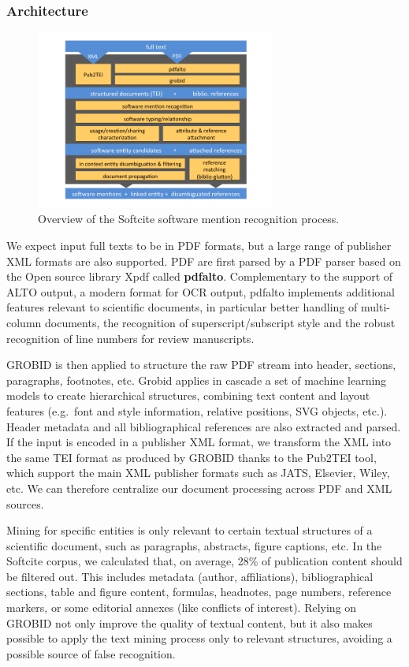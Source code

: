 \documentclass[
]{article}
\begin{document}
\hypertarget{architecture}{%
\subsubsection{Architecture}\label{architecture}}

\begin{figure}
\centering
\includegraphics[width=0.7\textwidth,height=\textheight]{workflow_software_mention.png}
\caption{Overview of the Softcite software mention recognition process.}
\end{figure}

We expect input full texts to be in PDF formats, but a large range of
publisher XML formats are also supported. PDF are first parsed by a PDF
parser based on the Open source library Xpdf called \textbf{pdfalto}.
Complementary to the support of ALTO output, a modern format for OCR
output, pdfalto implements additional features relevant to scientific
documents, in particular better handling of multi-column documents, the
recognition of superscript/subscript style and the robust recognition of
line numbers for review manuscripts.

GROBID is then applied to structure the raw PDF stream into header,
sections, paragraphs, footnotes, etc. Grobid applies in cascade a set of
machine learning models to create hierarchical structures, combining
text content and layout features (e.g.~font and style information,
relative positions, SVG objects, etc.). Header metadata and all
bibliographical references are also extracted and parsed. If the input
is encoded in a publisher XML format, we transform the XML into the same
TEI format as produced by GROBID thanks to the Pub2TEI tool, which
support the main XML publisher formats such as JATS, Elsevier, Wiley,
etc. We can therefore centralize our document processing across PDF and
XML sources.

Mining for specific entities is only relevant to certain textual
structures of a scientific document, such as paragraphs, abstracts,
figure captions, etc. In the Softcite corpus, we calculated that, on
average, 28\% of publication content should be filtered out. This
includes metadata (author, affiliations), bibliographical sections,
table and figure content, formulas, headnotes, page numbers, reference
markers, or some editorial annexes (like conflicts of interest). Relying
on GROBID not only improve the quality of textual content, but it also
makes possible to apply the text mining process only to relevant
structures, avoiding a possible source of false recognition.
\end{document}
